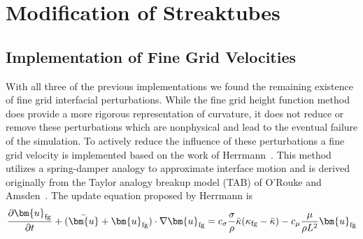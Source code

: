 \section{Modification of Streaktubes}

\subsection{Implementation of Fine Grid Velocities}
With all three of the previous implementations we found the remaining existence of fine grid interfacial perturbations. While the fine grid height function method does provide a more rigorous representation of curvature, it does not reduce or remove these perturbations which are nonphysical and lead to the eventual failure of the simulation. To actively reduce the influence of these perturbations a fine grid velocity is implemented based on the work of Herrmann~\cite{Herrmann2013}. This method utilizes a spring-damper analogy to approximate interface motion and is derived  originally from the Taylor analogy breakup model (TAB) of O'Rouke and Amsden~\cite{TAB}. The update equation proposed by Herrmann  is 
\begin{equation}
\frac{\partial \bm{u}_{\text{fg}}}{\partial t} +
(\bar{\bm{u}}+\bm{u}_{\text{fg}}) \cdot \nabla \bm{u}_{\text{fg}} = \\
c_{\sigma}\frac{\sigma}{\rho}\bar{\kappa}(\kappa_{\text{fg}}-\bar{\kappa})- 
c_{\mu}\frac{\mu}{\rho L^2}\bm{u}_{\text{fg}}\nonumber
\label{eqn:HermEq}
\end{equation}

